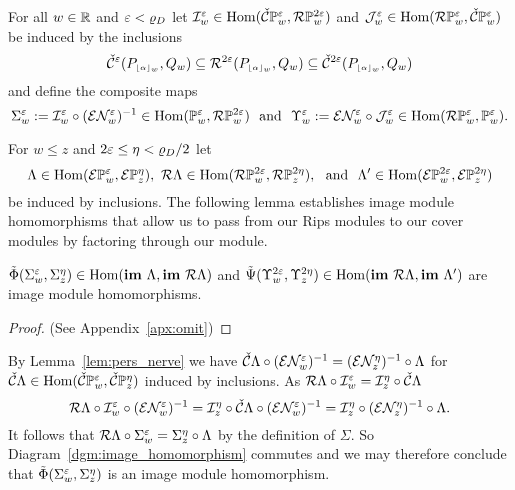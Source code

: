 For all $w\in\mathbb{R}$ and $\varepsilon < \varrho_D$ let $\mathcal{I}_w^\varepsilon\in\mathrm{Hom}(\check{\mathcal{C}}\mathbb{P}_{w}^{\varepsilon}, \mathcal{R}\mathbb{P}_{w}^{2\varepsilon})$ and $\mathcal{J}_w^\varepsilon\in\mathrm{Hom}(\mathcal{R}\mathbb{P}_{w}^{\varepsilon},\check{\mathcal{C}}\mathbb{P}_{w}^{\varepsilon})$ be induced by the inclusions
\[ \check{\mathcal{C}}^\varepsilon(P_{\scriptscriptstyle \lfloor\alpha\rfloor_{w}}, Q_w)\subseteq \mathcal{R}^{2\varepsilon}(P_{\scriptscriptstyle \lfloor\alpha\rfloor_{w}},Q_w)\subseteq \check{\mathcal{C}}^{2\varepsilon}(P_{\scriptscriptstyle \lfloor\alpha\rfloor_{w}}, Q_w)\]
and define the composite maps
\[\Sigma_w^\e := \I_w^\e\circ (\E\N_w^\e)^{-1}\in \Hom(\PP{w}{\e},\RPP{w}{2\e})\ \text{ and }\ \Upsilon_w^\e := \E\N_w^{\e}\circ \J_w^{\e}\in \Hom(\RPP{w}{\e},\PP{w}{\e}).\]


For $w\leq z$ and $2\varepsilon \leq \eta < \varrho_D / 2$ let
\[ \Lambda\in\Hom(\ext{\PP{w}{\e}}, \ext{\PP{z}{\eta}}),\ \rips\Lambda\in\Hom(\RPP{w}{2\e},\RPP{z}{2\eta}),\ \text{ and }\ \Lambda'\in\Hom(\ext{\PP{w}{2\e}},\ext{\PP{z}{2\eta}})\]
be induced by inclusions.
The following lemma establishes image module homomorphisms that allow us to pass from our Rips modules to our cover modules by factoring through our \Cech module.

\begin{lemma}\label{lem:rips_homomorphism_left}
  $\tilde{\Phi}(\Sigma_w^\varepsilon,\Sigma_z^\eta)\in\mathrm{Hom}(\mathbf{im}~\Lambda,\mathbf{im}~\mathcal{R}\Lambda)$ and $\tilde{\Psi}(\Upsilon_w^{2\varepsilon},\Upsilon_z^{2\eta})\in\mathrm{Hom}(\mathbf{im}~\mathcal{R}\Lambda,\mathbf{im}~\Lambda')$ are image module homomorphisms.
\end{lemma}
\begin{proof}
  (See Appendix~\ref{apx:omit})
\end{proof}
\proofatend
  By Lemma~\ref{lem:pers_nerve} we have $\check{\mathcal{C}}\Lambda\circ (\mathcal{E}\mathcal{N}_w^\varepsilon)^{-1} = (\mathcal{E}\mathcal{N}_z^\eta)^{-1}\circ \Lambda$ for $\check{\mathcal{C}}\Lambda\in\mathrm{Hom}(\check{\mathcal{C}}\mathbb{P}_{w}^{\varepsilon},\check{\mathcal{C}}\mathbb{P}_{z}^{\eta})$ induced by inclusions.
  As $\mathcal{R}\Lambda\circ\mathcal{I}_w^\varepsilon = \mathcal{I}_z^\eta\circ\check{\mathcal{C}}\Lambda$
  \[ \mathcal{R}\Lambda\circ \mathcal{I}_w^\varepsilon\circ(\mathcal{E}\mathcal{N}_w^\varepsilon)^{-1} = \mathcal{I}_z^\eta\circ\check{\mathcal{C}}\Lambda\circ (\mathcal{E}\mathcal{N}_w^\varepsilon)^{-1} = \mathcal{I}_z^\eta\circ (\mathcal{E}\mathcal{N}_z^\eta)^{-1}\circ\Lambda.\]
  It follows that $\mathcal{R}\Lambda\circ\Sigma_w^\varepsilon = \Sigma_z^\eta\circ\Lambda$ by the definition of $\Sigma$.
  So Diagram~\ref{dgm:image_homomorphism} commutes and we may therefore conclude that $\tilde{\Phi}(\Sigma_w^\varepsilon,\Sigma_z^\eta)$ is an image module homomorphism.

